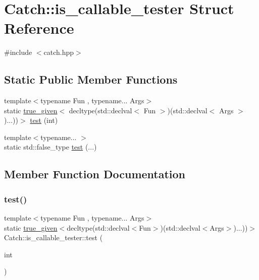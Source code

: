 \hypertarget{struct_catch_1_1is__callable__tester}{}\section{Catch\+:\+:is\+\_\+callable\+\_\+tester Struct Reference}
\label{struct_catch_1_1is__callable__tester}


{\ttfamily \#include $<$catch.\+hpp$>$}

\subsection*{Static Public Member Functions}
\begin{DoxyCompactItemize}
\item 
{\footnotesize template$<$typename Fun , typename... Args$>$ }\\static \mbox{\hyperlink{struct_catch_1_1true__given}{true\+\_\+given}}$<$ decltype(std\+::declval$<$ Fun $>$)(std\+::declval$<$ Args $>$)...))$>$ \mbox{\hyperlink{struct_catch_1_1is__callable__tester_a91c513c4fc18b01b96fa0132706f34b3}{test}} (int)
\item 
{\footnotesize template$<$typename... $>$ }\\static std\+::false\+\_\+type \mbox{\hyperlink{struct_catch_1_1is__callable__tester_adce16c4accb860bf46f6491dd70cfd63}{test}} (...)
\end{DoxyCompactItemize}


\subsection{Member Function Documentation}
\mbox{\label{struct_catch_1_1is__callable__tester_a91c513c4fc18b01b96fa0132706f34b3}} 
\subsubsection{\texorpdfstring{test()}{test()}\hspace{0.1cm}{\footnotesize\ttfamily [1/2]}}
{\footnotesize\ttfamily template$<$typename Fun , typename... Args$>$ \\
static \mbox{\hyperlink{struct_catch_1_1true__given}{true\+\_\+given}}$<$decltype(std\+::declval$<$Fun$>$)(std\+::declval$<$Args$>$)...))$>$ Catch\+::is\+\_\+callable\+\_\+tester\+::test (\begin{DoxyParamCaption}\item[{int}]{ }\end{DoxyParamCaption})\hspace{0.3cm}{\ttfamily [static]}}


